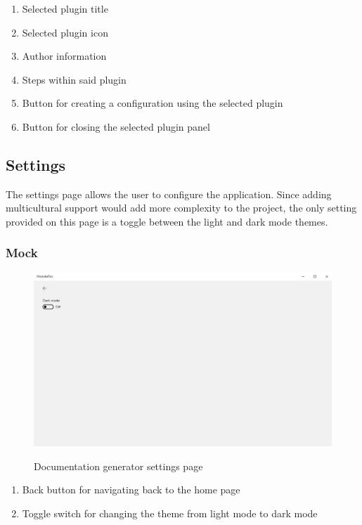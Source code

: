 \begin{enumerate}
    \item Selected plugin title
    \item Selected plugin icon
    \item Author information
    \item Steps within said plugin
    \item Button for creating a configuration using the selected plugin
    \item Button for closing the selected plugin panel
\end{enumerate}

\subsection{Settings}

The settings page allows the user to configure the application. Since adding multicultural support would add more complexity to the project, the only setting provided on this page is a toggle between the light and dark mode themes.

\subsubsection{Mock}

\begin{figure}[H]
    \includegraphics[width=\linewidth]{img/mockSettings.png}
    \label{fig:settingsPage}
    \caption{Documentation generator settings page}
\end{figure}

\begin{enumerate}
    \item Back button for navigating back to the home page
    \item Toggle switch for changing the theme from light mode to dark mode
\end{enumerate}

